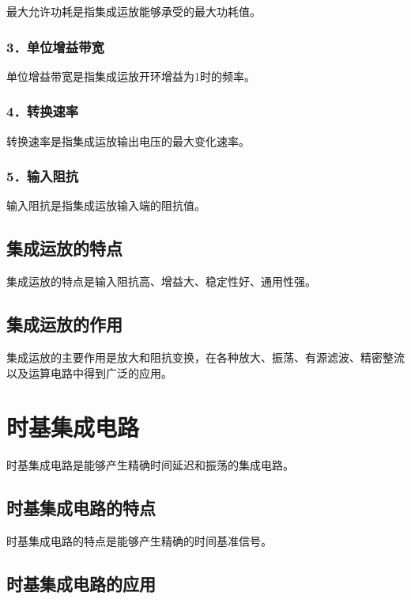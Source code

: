 \documentclass[12pt,UTF8]{ctexbook}
\begin{document}
最大允许功耗是指集成运放能够承受的最大功耗值。

\subsubsection{3．单位增益带宽}

单位增益带宽是指集成运放开环增益为1时的频率。

\subsubsection{4．转换速率}

转换速率是指集成运放输出电压的最大变化速率。

\subsubsection{5．输入阻抗}

输入阻抗是指集成运放输入端的阻抗值。

\subsection{集成运放的特点}

集成运放的特点是输入阻抗高、增益大、稳定性好、通用性强。

\subsection{集成运放的作用}

集成运放的主要作用是放大和阻抗变换，在各种放大、振荡、有源滤波、精密整流以及运算电路中得到广泛的应用。

\section{时基集成电路}

时基集成电路是能够产生精确时间延迟和振荡的集成电路。

\subsection{时基集成电路的特点}

时基集成电路的特点是能够产生精确的时间基准信号。

\subsection{时基集成电路的应用}
\end{document}
